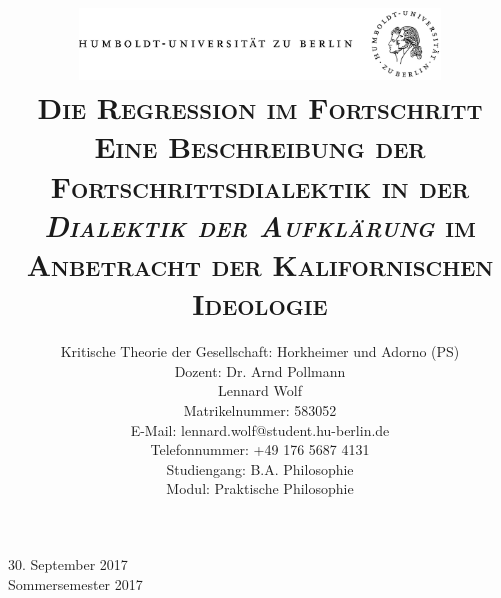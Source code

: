 \documentclass[a4paper, 12pt]{article}
\date{\vspace{-3ex}}
\begin{document}
\title{\vspace{5ex}
	\includegraphics*[bb=0 0 720 200, width=0.72\textwidth]{ErstesSem/images/hu_logo.png}\\
	\vspace{30pt}
	\scshape\LARGE{Die Regression im Fortschritt}\\\Large{Eine Beschreibung der Fortschrittsdialektik in der \emph{Dialektik der Aufklärung} im Anbetracht der Kalifornischen Ideologie}\\\vspace{20pt}}
	


\author{Kritische Theorie der Gesellschaft: Horkheimer und Adorno (PS)\\
	\vspace{7pt}
          Dozent: Dr. Arnd Pollmann\\\vspace{4pt}Lennard Wolf\\
        \small{Matrikelnummer: 583052}\\
        \small{E-Mail: lennard.wolf@student.hu-berlin.de}\\
        \small{Telefonnummer: +49 176 5687 4131}\\
        \small{Studiengang: B.A. Philosophie}\\
        \small{Modul: Praktische Philosophie}}


\maketitle

\vspace{\fill}

\begin{minipage}[]{0.92\textwidth}
    \centering
    \onehalfspacing
    \large   
    30. September 2017\\
    Sommersemester 2017

    \vspace{-20mm} 
\end{minipage}%
\thispagestyle{empty}
\newpage
\setcounter{page}{1}
\end{document}
